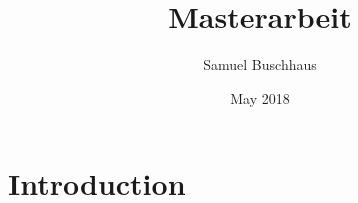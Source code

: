 \documentclass{article}
\title{Masterarbeit}
\author{Samuel Buschhaus}
\date{May 2018}
\begin{document}
\maketitle

\section{Introduction}
\end{document}

